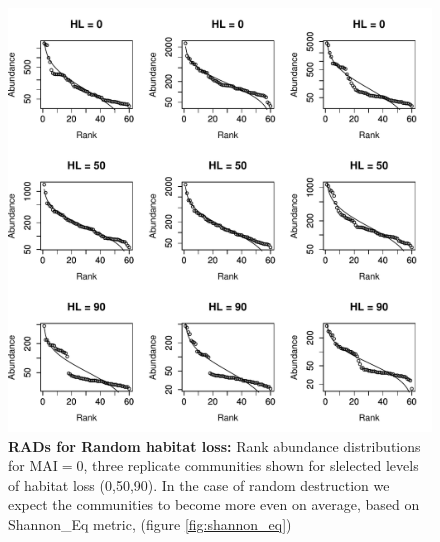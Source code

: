 \begin{figure}[p] 
		\centering      
        \includegraphics[width=\textwidth]{"random_plots/RADs_mut0"}
        \caption{\textbf{RADs for Random habitat loss:} Rank abundance distributions for MAI$=0$, three replicate communities shown for slelected levels of habitat loss (0,50,90). In the case of random destruction we expect the communities to become more even on average, based on Shannon\_Eq metric, (figure \ref{fig:shannon_eq})}\label{fig:RADS_random}
\end{figure}


